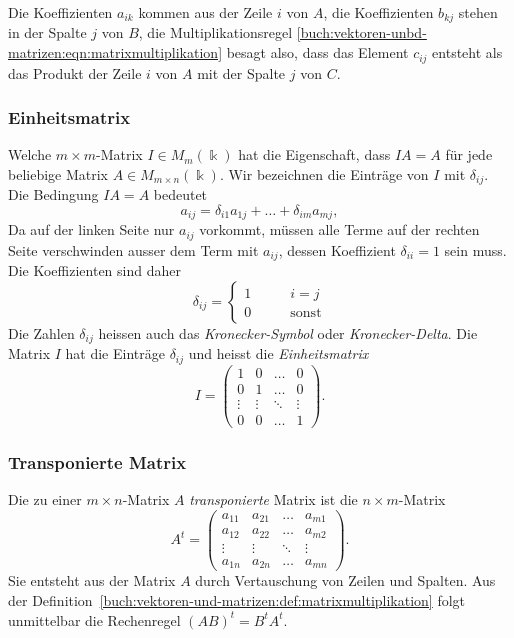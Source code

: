 Die Koeffizienten $a_{ik}$ kommen aus der Zeile $i$ von $A$, die Koeffizienten
$b_{kj}$ stehen in der Spalte $j$ von $B$, die Multiplikationsregel
\eqref{buch:vektoren-unbd-matrizen:eqn:matrixmultiplikation}
besagt also, dass das Element $c_{i\!j}$ entsteht als das Produkt
der Zeile $i$ von $A$ mit der Spalte $j$ von $C$.

\subsubsection{Einheitsmatrix}
Welche $m\times m$-Matrix $I\in M_{m}(\Bbbk)$ hat die Eigenschaft, dass
$IA=A$ für jede beliebige Matrix $A\in M_{m\times n}(\Bbbk)$.
Wir bezeichnen die Einträge von $I$ mit $\delta_{i\!j}$.
Die Bedingung $IA=A$ bedeutet
\[
a_{i\!j} = \delta_{i1}a_{1j} + \dots + \delta_{im}a_{mj},
\]
Da auf der linken Seite nur $a_{i\!j}$ vorkommt, müssen alle Terme auf der
rechten Seite verschwinden ausser dem Term mit $a_{i\!j}$, dessen
Koeffizient $\delta_{ii}=1$ sein muss.
Die Koeffizienten sind daher
\[
\delta_{i\!j}
=
\begin{cases}
1&\qquad i=j\\
0&\qquad\text{sonst}
\end{cases}
\]
Die Zahlen $\delta_{i\!j}$ heissen auch das {\em Kronecker-Symbol} oder
{\em Kronecker-Delta}.
%
%
Die Matrix $I$ hat die Einträge $\delta_{i\!j}$ und heisst die
{\em Einheitsmatrix}
%
\[
I
=
\begin{pmatrix}
1     &0     &\dots &0     \\
0     &1     &\dots &0     \\[-2pt]
\vdots&\vdots&\ddots&\vdots\\
0     &0     &\dots &1
\end{pmatrix}.
\]

\subsubsection{Transponierte Matrix}
%
%
Die zu einer $m\times n$-Matrix $A$ {\em transponierte} Matrix ist die
$n\times m$-Matrix
\[
A^t=\begin{pmatrix}
a_{11}&a_{21}&\dots&a_{m1}\\
a_{12}&a_{22}&\dots&a_{m2}\\
\vdots&\vdots&\ddots&\vdots\\
a_{1n}&a_{2n}&\dots&a_{mn}
\end{pmatrix}.
\]
Sie entsteht aus der Matrix $A$ durch Vertauschung von Zeilen und Spalten.
Aus der Definition~\ref{buch:vektoren-und-matrizen:def:matrixmultiplikation}
folgt unmittelbar die Rechenregel $(AB)^t = B^tA^t$.

